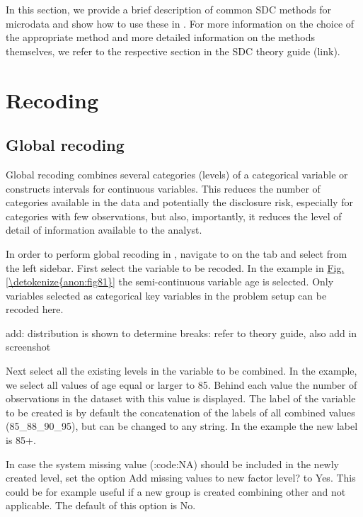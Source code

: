 \documentclass[letterpaper,10pt,english]{sphinxmanual}
\begin{document}
In this section, we provide a brief description of common SDC methods for microdata and
show how to use these in . For more information on the choice of the
appropriate method and more detailed information on the methods themselves, we refer to
the respective section in the SDC theory guide (link).


\section{Recoding}
\label{\detokenize{anon:recoding}}

\subsection{Global recoding}
\label{\detokenize{anon:global-recoding}}
Global recoding combines several categories (levels) of a categorical variable or constructs
intervals for continuous variables. This reduces the number of categories available
in the data and potentially the disclosure risk, especially for categories with few
observations, but also, importantly, it reduces the level of detail of information
available to the analyst.

In order to perform global recoding in , navigate to on the  tab and
select  from the left sidebar. First select the variable to be recoded. In the
example in \hyperref[\detokenize{anon:fig81}]{Fig.\@ \ref{\detokenize{anon:fig81}}} the semi-continuous variable age is selected. Only
variables selected as categorical key variables in the problem setup can be recoded here.

add: distribution is shown to determine breaks: refer to theory guide, also add in screenshot

Next select all the existing levels in the variable to be combined. In the example, we
select all values of age equal or larger to 85. Behind each value the number of observations
in the dataset with this value is displayed. The label of the variable to be created
is by default the concatenation of the labels of all combined values (85\_88\_90\_95), but can
be changed to any string. In the example the new label is 85+.

In case the system missing value (:code:NA) should be included in the newly created level,
set the option Add missing values to new factor level? to Yes. This could be for example
useful if a new group is created combining other and not applicable.
The default of this option is No.
\end{document}
